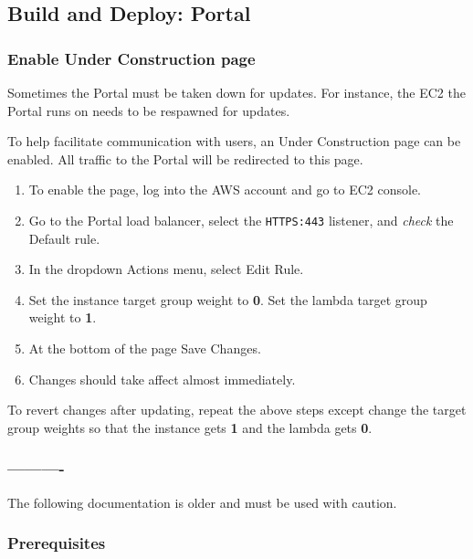 \subsection{Build and Deploy: Portal}

\subsubsection{Enable Under Construction page}

Sometimes the Portal must be taken down for updates. For instance, the EC2 the Portal runs on needs to be respawned for updates.

To help facilitate communication with users, an Under Construction page can be enabled. All traffic to the Portal will be redirected to this page.

\begin{enumerate}
\item To enable the page, log into the AWS account and go to EC2 console.


\item Go to the Portal load balancer, select the \texttt{HTTPS:443} listener, and \textit{check} the Default rule.


\item In the dropdown Actions menu, select Edit Rule.


\item Set the instance target group weight to \textbf{0}. Set the lambda target group weight to \textbf{1}.


\item At the bottom of the page Save Changes.


\item Changes should take affect almost immediately.
\end{enumerate}

To revert changes after updating, repeat the above steps except change the target group weights so that the instance gets \textbf{1} and the lambda gets \textbf{0}.

\subsubsection{----------}

The following documentation is older and must be used with caution.

\subsubsection{Prerequisites}

